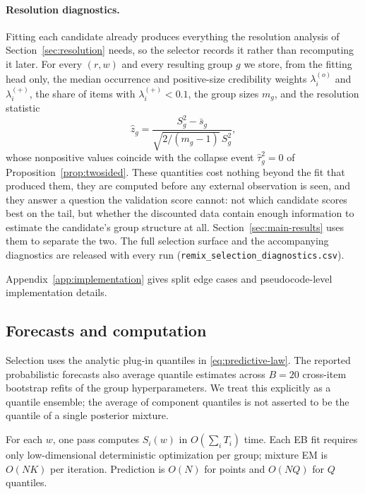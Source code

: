 \documentclass[twoside]{article}
\theoremstyle{definition}
\begin{document}
\paragraph{Resolution diagnostics.}
Fitting each candidate already produces everything the resolution
analysis of Section~\ref{sec:resolution} needs, so the selector records it
rather than recomputing it later. For every $(r,w)$ and every resulting
group $g$ we store, from the fitting head only, the median occurrence and
positive-size credibility weights $\lambda_i^{(o)}$ and $\lambda_i^{(+)}$,
the share of items with $\lambda_i^{(+)}<0.1$, the group sizes $m_g$, and
the resolution statistic
\[
\hat z_g=\frac{S_g^2-\bar s_g}{\sqrt{2/(m_g-1)}\,S_g^2},
\]
whose nonpositive values coincide with the collapse event
$\hat\tau_g^2=0$ of Proposition~\ref{prop:twosided}. These quantities cost
nothing beyond the fit that produced them, they are computed before any
external observation is seen, and they answer a question the validation
score cannot: not which candidate scores best on the tail, but whether the
discounted data contain enough information to estimate the candidate's
group structure at all. Section~\ref{sec:main-results} uses them to
separate the two. The full selection surface and the accompanying
diagnostics are released with every run
(\texttt{remix\_selection\_diagnostics.csv}).

Appendix~\ref{app:implementation} gives split edge cases and
pseudocode-level implementation details.

\subsection{Forecasts and computation}\label{sec:complexity}

Selection uses the analytic plug-in quantiles in
\eqref{eq:predictive-law}. The reported probabilistic forecasts also
average quantile estimates across $B=20$ cross-item bootstrap refits of
the group hyperparameters. We treat this explicitly as a quantile
ensemble; the average of component quantiles is not asserted to be the
quantile of a single posterior mixture.

For each $w$, one pass computes $S_i(w)$ in $O(\sum_iT_i)$ time. Each EB
fit requires only low-dimensional deterministic optimization per group;
mixture EM is $O(NK)$ per iteration. Prediction is $O(N)$ for points and
$O(NQ)$ for $Q$ quantiles.
\end{document}
